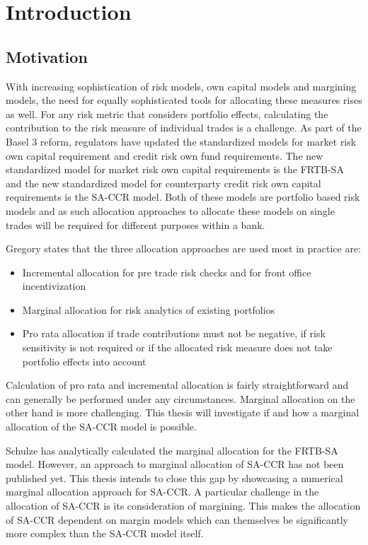 \documentclass[../Thesis_AHoecherl.tex]{subfiles}
\begin{document}
    \chapter{Introduction}
    \section{Motivation}
    With increasing sophistication of risk models, own capital models and margining models, the need for equally sophisticated tools for allocating these measures rises as well. For any risk metric that considers portfolio effects, calculating the contribution to the risk measure of individual trades is a challenge. As part of the Basel 3 reform, regulators have updated the standardized models for market risk own capital requirement and credit risk own fund requirements. The new standardized model for market risk own capital requirements is the \gls{FRTB-SA} and the new standardized model for counterparty credit risk own capital requirements is the \gls{SA-CCR} model. Both of these models are portfolio based risk models and as such allocation approaches to allocate these models on single trades will be required for different purposes within a bank. 
    
    Gregory \cite[Chapter~10.7]{gregory2015xva} states that the three allocation approaches are used most in practice are:

    \begin{itemize}
        \item Incremental allocation for pre trade risk checks and for front office incentivization  
        \item Marginal allocation for risk analytics of existing portfolios 
        \item Pro rata allocation if trade contributions must not be negative, if risk sensitivity is not required or if the allocated risk measure does not take portfolio effects into account
    \end{itemize}

    Calculation of pro rata and incremental allocation is fairly straightforward and can generally be performed under any circumstances. Marginal allocation on the other hand is more challenging. This thesis will investigate if and how a marginal allocation of the \gls{SA-CCR} model is possible.

    Schulze \cite{schulze2018capital} has analytically calculated the marginal allocation for the FRTB-SA model. However, an approach to marginal allocation of \gls{SA-CCR} has not been published yet. This thesis intends to close this gap by showcasing a numerical marginal allocation approach for \gls{SA-CCR}. A particular challenge in the allocation of \gls{SA-CCR} is its consideration of margining. This makes the allocation of \gls{SA-CCR} dependent on margin models which can themselves be significantly more complex than the \gls{SA-CCR} model itself.
\end{document}
